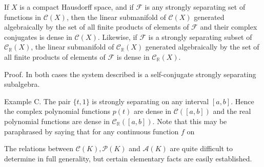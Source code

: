 If $X$ is a compact Hausdorff space, and if $\mathcal{F}$ is any strongly separating set of functions in $\mathcal{C}(X)$, then the linear submanifold of $\mathcal{C}(X)$ generated algebraically by the set of all finite products of elements of $\mathcal{F}$ and their complex conjugates is dense in $\mathcal{C}(X)$. Likewise, if $\mathcal{F}$ is a strongly separating subset of $\mathcal{C}_{\mathbb{R}}(X)$, the linear submanifold of $\mathcal{C}_{\mathbb{R}}(X)$ generated algebraically by the set of all finite products of elements of $\mathcal{F}$ is dense in $\mathcal{C}_{\mathbb{R}}(X)$.

Proof. In both cases the system described is a self-conjugate strongly separating subalgebra.

Example C. The pair $\{t, 1\}$ is strongly separating on any interval $[a, b]$. Hence the complex polynomial functions $p(t)$ are dense in $\mathcal{C}([a, b])$ and the real polynomial functions are dense in $\mathcal{C}_{\mathbb{R}}([a, b])$. Note that this may be paraphrased by saying that for any continuous function $f$ on

The relations between $\mathcal{C}(K), \mathcal{P}(K)$ and $\mathcal{A}(K)$ are quite difficult to determine in full generality, but certain elementary facts are easily established.
